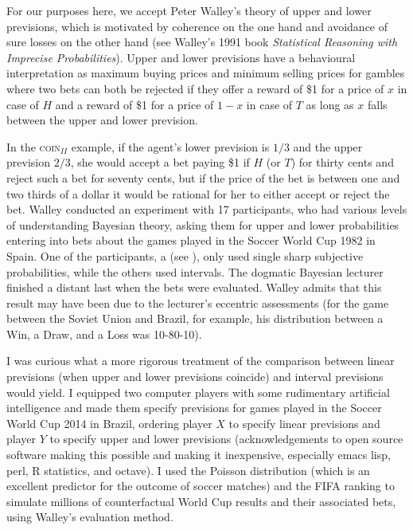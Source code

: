 For our purposes here, we accept Peter Walley's theory of upper and lower previsions, which is motivated by coherence on the one hand and avoidance of sure losses on the other hand (see Walley's 1991 book \emph{Statistical Reasoning with Imprecise Probabilities}). Upper and lower previsions have a behavioural interpretation as maximum buying prices and minimum selling prices for gambles where two bets can both be rejected if they offer a reward of \$1 for a price of $x$ in case of $H$ and a reward of \$1 for a price of $1-x$ in case of $T$ as long as $x$ falls between the upper and lower prevision.

In the \textsc{coin}$_{II}$ example, if the agent's lower prevision is $1/3$ and the upper prevision $2/3$, she would accept a bet paying \$1 if $H$ (or $T$) for thirty cents and reject such a bet for seventy cents, but if the price of the bet is between one and two thirds of a dollar it would be rational for her to either accept or reject the bet. Walley conducted an experiment with 17 participants, who had various levels of understanding Bayesian theory, asking them for upper and lower probabilities entering into bets about the games played in the Soccer World Cup 1982 in Spain. One of the participants, a  (see ), only used single sharp subjective probabilities, while the others used intervals. The dogmatic Bayesian lecturer finished a distant last when the bets were evaluated. Walley admits that this result may have been due to the lecturer's eccentric assessments (for the game between the Soviet Union and Brazil, for example, his distribution between a Win, a Draw, and a Loss was 10-80-10).

I was curious what a more rigorous treatment of the comparison between linear previsions (when upper and lower previsions coincide) and interval previsions would yield. I equipped two computer players with some rudimentary artificial intelligence and made them specify previsions for games played in the Soccer World Cup 2014 in Brazil, ordering player $X$ to specify linear previsions and player $Y$ to specify upper and lower previsions (acknowledgements to open source software making this possible and making it inexpensive, especially emacs lisp, perl, R statistics, and octave). I used the Poisson distribution (which is an excellent predictor for the outcome of soccer matches) and the FIFA ranking to simulate millions of counterfactual World Cup results and their associated bets, using Walley's evaluation method.

